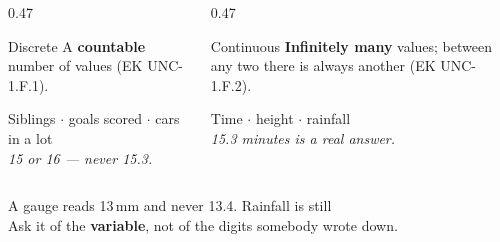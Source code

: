 \documentclass[aspectratio=169, 11pt]{beamer}
\begin{document}
\begin{frame}[t, plain]
  \vspace{4pt}
  \begin{columns}[t]
    \begin{column}{0.47\textwidth}
      \begin{block}{Discrete}
        A \textbf{countable} number of values (EK UNC-1.F.1).
      \end{block}
      \vspace{4pt}
      {\small Siblings $\cdot$ goals scored $\cdot$ cars in a lot\\[3pt]
      \emph{15 or 16 --- never 15.3.}}
    \end{column}
    \begin{column}{0.47\textwidth}
      \begin{block}{Continuous}
        \textbf{Infinitely many} values; between any two there is always another
        (EK UNC-1.F.2).
      \end{block}
      \vspace{4pt}
      {\small Time $\cdot$ height $\cdot$ rainfall\\[3pt]
      \emph{15.3 minutes is a real answer.}}
    \end{column}
  \end{columns}
  \vspace{12pt}
  \begin{center}
    {\large A gauge reads 13\,mm and never 13.4. Rainfall is still }\\[6pt]
    {\small\color{slate} Ask it of the \textbf{variable}, not of the digits somebody wrote down.}
  \end{center}
\end{frame}
\end{document}
